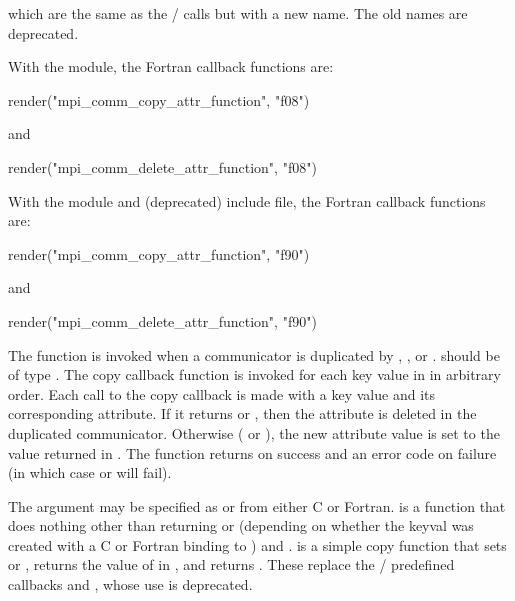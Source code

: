 \noindent
which are the same as the \mpiidoti/ calls but with a new name.
The old names are deprecated.

\noindent
With the  module, the Fortran callback functions are:

\begin{mpi-binding}
    render("mpi_comm_copy_attr_function", "f08")
\end{mpi-binding}
 
\noindent
and
 
\begin{mpi-binding}
    render("mpi_comm_delete_attr_function", "f08")
\end{mpi-binding}

\noindent
With the  module and (deprecated)  include file, the Fortran callback functions are:

\begin{mpi-binding}
    render("mpi_comm_copy_attr_function", "f90")
\end{mpi-binding}

\noindent
and

\begin{mpi-binding}
    render("mpi_comm_delete_attr_function", "f90")
\end{mpi-binding}

The  function is invoked when a communicator is
duplicated by , , 
or .
 should be
of type .
The copy callback function is invoked for each key value in
 in arbitrary order. Each call
to the copy callback is made with a key value and its corresponding attribute.
If it returns  or , then the
attribute is deleted in the duplicated communicator. Otherwise
( or ),
the new attribute value is set to the value
returned in
.
The function returns  on
success and an error code on failure (in which case
 or  will fail).

The argument  may be specified as
 or
from either C or Fortran.
is a function that does nothing other than returning 
or  (depending on whether the keyval
 was created with a C or Fortran binding to
 ) and .
 is a simple
copy function that sets  or ,
returns the value of
 in , and
returns .
These replace the \mpii/ predefined callbacks 
and , whose use is deprecated.

